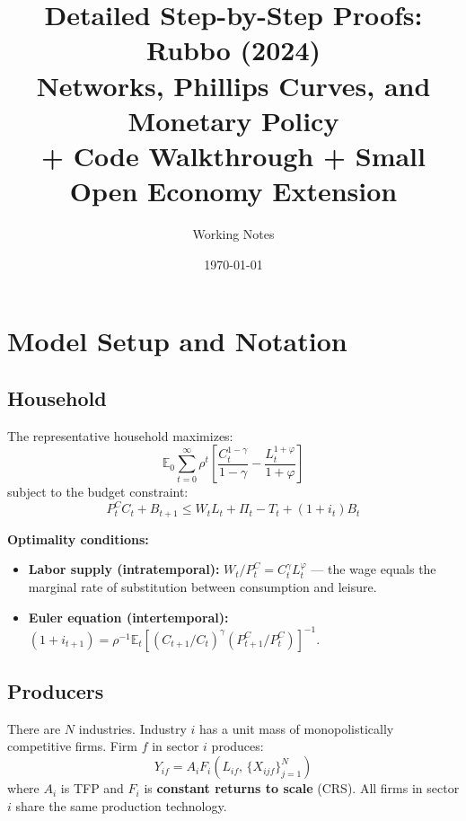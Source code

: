 \documentclass[12pt]{article}
\title{Detailed Step-by-Step Proofs: Rubbo (2024) \\ \large Networks, Phillips Curves, and Monetary Policy \\ \normalsize + Code Walkthrough + Small Open Economy Extension}
\author{Working Notes}
\date{\today}
\begin{document}
\maketitle
\tableofcontents
\newpage

\section{Model Setup and Notation}

\subsection{Household}

The representative household maximizes:
\begin{equation}
    \mathbb{E}_0 \sum_{t=0}^\infty \rho^t \left[\frac{C_t^{1-\gamma}}{1-\gamma} - \frac{L_t^{1+\varphi}}{1+\varphi}\right]
\end{equation}
subject to the budget constraint:
\begin{equation}
    P_t^C C_t + B_{t+1} \leq W_t L_t + \Pi_t - T_t + (1+i_t) B_t
\end{equation}

\textbf{Optimality conditions:}
\begin{itemize}
    \item \textbf{Labor supply (intratemporal):} $W_t / P_t^C = C_t^\gamma L_t^\varphi$ — the wage equals the marginal rate of substitution between consumption and leisure.
    \item \textbf{Euler equation (intertemporal):} $(1+i_{t+1}) = \rho^{-1} \mathbb{E}_t\left[(C_{t+1}/C_t)^\gamma (P_{t+1}^C/P_t^C)\right]^{-1}$.
\end{itemize}

\subsection{Producers}

There are $N$ industries. Industry $i$ has a unit mass of monopolistically competitive firms. Firm $f$ in sector $i$ produces:
\begin{equation}
    Y_{if} = A_i F_i\!\left(L_{if},\, \{X_{ijf}\}_{j=1}^N\right)
\end{equation}
where $A_i$ is TFP and $F_i$ is \textbf{constant returns to scale} (CRS). All firms in sector $i$ share the same production technology.
\end{document}
